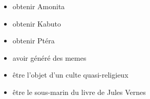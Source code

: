 \documentclass[11pt,a4paper]{article}
\begin{document}
\begin{table}[ht!]
  \centering
  \begin{minipage}{0.40\textwidth}
    \centering
\begin{itemize}
  \item[\checkmark] obtenir Amonita \\
  \item[\CaseCoche] obtenir Kabuto \\
  \item[\CaseCoche] obtenir Ptéra \\
\end{itemize}
  \end{minipage}
  \hfillx
  \begin{minipage}{0.50\textwidth}
    \centering
\begin{itemize}
  \item[\checkmark] avoir généré des memes \\
  \item[\checkmark] être l'objet d'un culte quasi-religieux \\
  \item[\CaseCoche] être le sous-marin du livre de Jules Vernes \\
\end{itemize}
  \end{minipage}
\end{table}

\vfillLast
\end{document}

